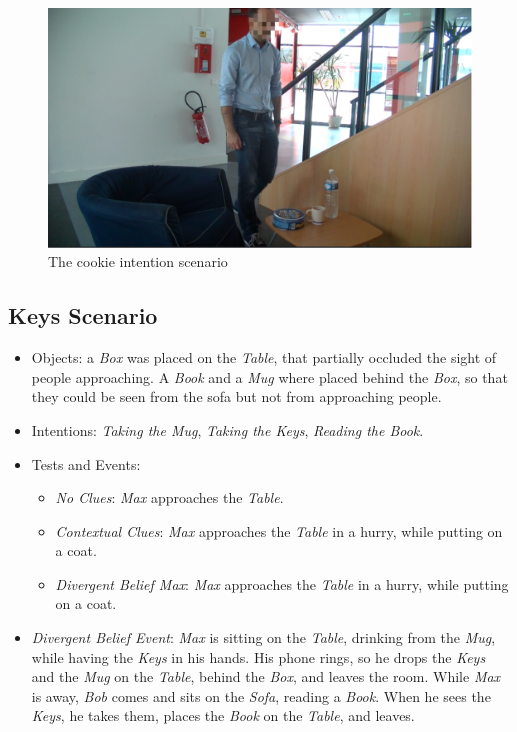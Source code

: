  \begin{figure}[ht!]
	\centering
	\includegraphics[scale=0.5]{img/observer/cookie1-blur.pdf}
	\caption{The cookie intention scenario}
	\label{fig:observer_experiments-cookie}
\end{figure}


\subsection{Keys Scenario}
\begin{itemize}
\item Objects: a \textit{Box} was placed on the \textit{Table}, that partially occluded the sight of people approaching. A \textit{Book} and a \textit{Mug} where placed behind the \textit{Box}, so that they could be seen from the sofa but not from approaching people.
\item Intentions: \textit{Taking the Mug}, \textit{Taking the Keys}, \textit{Reading the Book}.
\item Tests and Events:
\begin{itemize}
\item \textit{No Clues}: \textit{Max} approaches the \textit{Table}.
\item\textit{Contextual Clues}: \textit{Max} approaches the \textit{Table} in a hurry, while putting on a coat.
\item \textit{Divergent Belief Max}: \textit{Max} approaches the \textit{Table} in a hurry, while putting on a coat.
\end{itemize}
\item \textit{Divergent Belief Event}: \textit{Max} is sitting on the \textit{Table}, drinking from the \textit{Mug}, while having the \textit{Keys} in his hands. His phone rings, so he drops the \textit{Keys} and the \textit{Mug} on the \textit{Table}, behind the \textit{Box}, and leaves the room. While \textit{Max} is away, \textit{Bob} comes and sits on the \textit{Sofa}, reading a \textit{Book}. When he sees the \textit{Keys}, he takes them, places the \textit{Book} on the \textit{Table}, and leaves.
\end{itemize}

